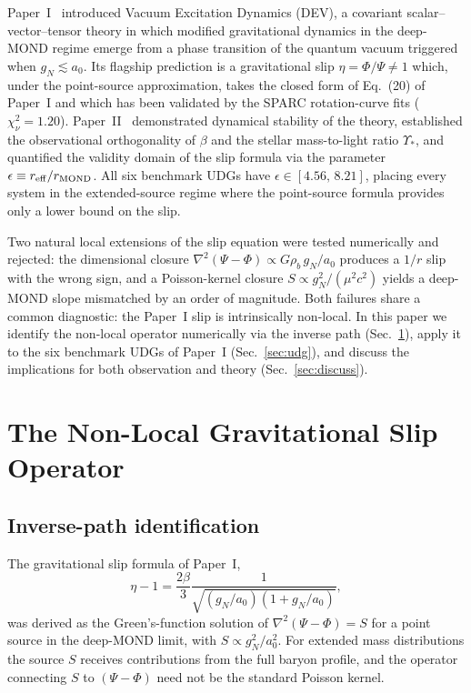 \documentclass[aps,prd,twocolumn,superscriptaddress,nofootinbib]{revtex4-2}
\newcommand{\aO}{a_0}
\begin{document}
Paper~I~\cite{DEV_paperI} introduced Vacuum Excitation Dynamics
(DEV), a covariant scalar--vector--tensor theory in which
modified gravitational dynamics in the deep-MOND regime
emerge from a phase transition of the quantum vacuum
triggered when $g_N \lesssim \aO$. Its flagship prediction
is a gravitational slip $\eta = \Phi/\Psi \neq 1$ which,
under the point-source approximation, takes the closed
form of Eq.~(20) of Paper~I and which has been validated by
the SPARC rotation-curve fits ($\chi^2_\nu = 1.20$).
Paper~II~\cite{DEV_paperII} demonstrated dynamical stability of
the theory, established the observational orthogonality of
$\beta$ and the stellar mass-to-light ratio $\Upsilon_*$,
and quantified the validity domain of the slip formula via
the parameter $\epsilon \equiv r_{\rm eff}/r_{\rm MOND}$.
All six benchmark UDGs have $\epsilon \in [4.56,\,8.21]$,
placing every system in the extended-source regime where
the point-source formula provides only a lower bound on
the slip.

Two natural local extensions of the slip equation were
tested numerically and rejected:
the dimensional closure
$\nabla^2(\Psi-\Phi) \propto G\rho_b\, g_N/\aO$ produces a
$1/r$ slip with the wrong sign, and a Poisson-kernel
closure $S\propto g_N^2/(\mu^2c^2)$ yields a deep-MOND
slope mismatched by an order of magnitude. Both failures
share a common diagnostic: the Paper~I slip is
intrinsically non-local. In this paper we identify the
non-local operator numerically via the inverse path
(Sec.~\ref{sec:nonlocal}), apply it to the six benchmark
UDGs of Paper~I (Sec.~\ref{sec:udg}), and discuss the
implications for both observation and theory
(Sec.~\ref{sec:discuss}).

\section{The Non-Local Gravitational Slip Operator}
\label{sec:nonlocal}

\subsection{Inverse-path identification}

The gravitational slip formula of Paper~I,
\begin{equation}
\eta - 1 = \frac{2\beta}{3}
\frac{1}{\sqrt{(g_N/\aO)(1+g_N/\aO)}},
\label{eq:eta_anal}
\end{equation}
was derived as the Green's-function solution of
$\nabla^2(\Psi-\Phi)=S$ for a point source in the
deep-MOND limit, with $S\propto g_N^2/\aO^2$.
For extended mass distributions the source $S$ receives
contributions from the full baryon profile, and the
operator connecting $S$ to $(\Psi-\Phi)$ need not be
the standard Poisson kernel.
\end{document}
